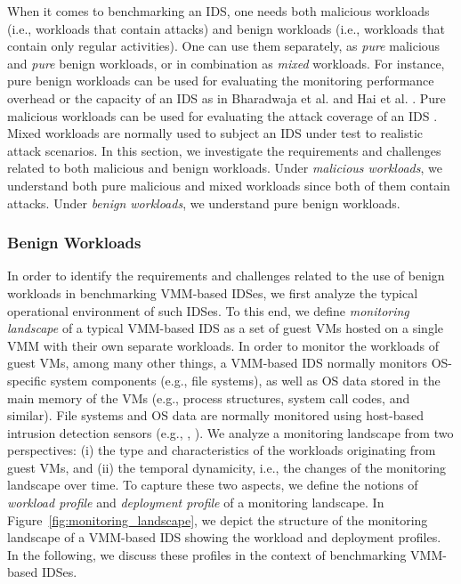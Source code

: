 When it comes to benchmarking an IDS, one needs both malicious workloads (i.e., workloads that contain attacks) and benign workloads (i.e., workloads that contain only regular activities). One can use them separately, as \emph{pure} malicious and \emph{pure} benign workloads, or in combination as \emph{mixed} workloads. For instance, pure benign workloads can be used for evaluating the monitoring performance overhead or the capacity of an IDS as in Bharadwaja et al. \cite{bharadwaja:axen} and Hai et al. \cite{hai:avmm-based}. Pure malicious workloads can be used for evaluating the attack coverage of an IDS \cite{mell:anoverview}. Mixed workloads are normally used to subject an IDS under test to realistic attack scenarios. In this section, we investigate the requirements and challenges related to both malicious and benign workloads. Under \emph{malicious workloads}, we understand both pure malicious and mixed workloads since both of them contain attacks. Under \emph{benign workloads}, we understand pure benign workloads. 

\subsubsection{Benign Workloads}
\label{sec:benign_workloads}
In order to identify the requirements and challenges related to the use of benign workloads in benchmarking VMM-based IDSes, we first analyze the typical operational environment of such IDSes. To this end, we define \emph{monitoring landscape} of a typical VMM-based IDS as a set of guest VMs hosted on a single VMM with their own separate workloads. In order to monitor the workloads of guest VMs, among many other things, a VMM-based IDS normally monitors OS-specific system components (e.g., file systems), as well as OS data stored in the main memory of the VMs (e.g., process structures, system call codes, and similar). File systems and OS data are normally monitored using host-based intrusion detection sensors (e.g., \cite{hai:vmfence}, \cite{bharadwaja:axen}). We analyze a monitoring landscape from two perspectives: (i) the type and characteristics of the workloads originating from guest VMs, and (ii) the temporal dynamicity, i.e., the changes of the monitoring landscape over time. To capture these two aspects, we define the notions of \emph{workload profile} and \emph{deployment profile} of a monitoring landscape. In Figure~\ref{fig:monitoring_landscape}, we depict the structure of the monitoring landscape of a VMM-based IDS showing the workload and deployment profiles. In the following, we discuss these profiles in the context of benchmarking VMM-based IDSes.

